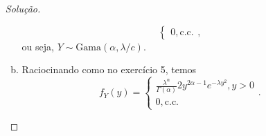 \documentclass[../Notas.tex]{subfiles}
\begin{document}
\begin{enumerate}
\begin{proof}[Solução]
\begin{enumerate}[a)]
\[\begin{cases}
            0, \text{c.c.}
            \end{cases},
            \]
            ou seja, $Y\sim\text{Gama}(\alpha, \lambda/c)$.
            \item Raciocinando como no exercício 5, temos
            \[
            f_Y(y) = \begin{cases}
            \frac{\lambda^{\alpha}}{\Gamma(\alpha)}2y^{2\alpha - 1}e^{-\lambda y^2}, y > 0 \\
            0, \text{c.c.}
            \end{cases}.
            \]
        \end{enumerate}
    \end{proof}
\end{enumerate}
\end{document}
